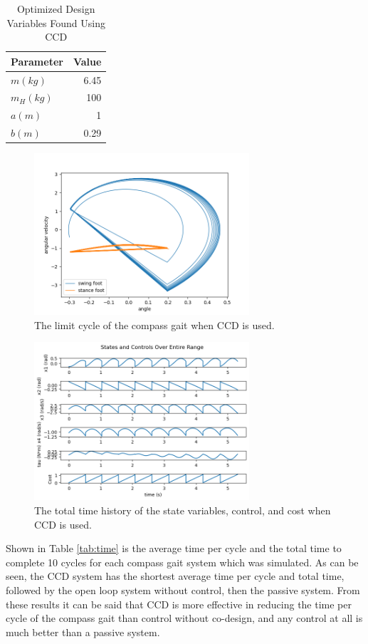 \documentclass[smallextended]{./springer/svjour3}
\begin{document}
\begin{table}[h]
\centering
\caption{Optimized Design Variables Found Using CCD}
\begin{tabular}{lr}
\toprule
Parameter & Value \\
\midrule
$m (kg)$ & 6.45 \\
$m_H (kg)$ & 100 \\
$a (m)$ & 1 \\
$b (m)$ & 0.29 \\
\end{tabular}
\label{tab:opt_vars}
\end{table}
  


\begin{figure}[h]
\centering
\includegraphics[width=8cm]{./figures/limcyc_CCD.png}
\caption{The limit cycle of the compass gait when CCD is used.}
\label{fig:limcyc_CCD}
\end{figure}

\begin{figure}[h]
\centering
\includegraphics[width=8cm]{./figures/timehis_CCD.png}
\caption{The total time history of the state variables, control, and cost when CCD is used.}
\label{fig:timehis_CCD}
\end{figure}  


Shown in Table \ref{tab:time} is the average time per cycle and the total time to complete 10 cycles for each compass gait system which was simulated. As can be seen, the CCD system 
has the shortest average time per cycle and total time, followed by the open loop system without control, then the passive system. From these results it can be said that 
CCD is more effective in reducing the time per cycle of the compass gait than control without co-design, and any control at all is much better than a passive system.
\end{document}
